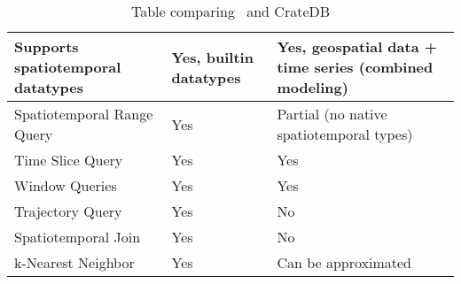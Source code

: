 \begin{table}[h]
\begin{tabular}{|P{3.3cm}|P{6cm}|P{4cm}|}
    Supports spatiotemporal datatypes & Yes, builtin datatypes                                              & Yes, geospatial data + time series (combined modeling) \\
    \hline
    Spatiotemporal Range Query        & Yes                                                                 & Partial (no native spatiotemporal types)               \\
    \hline
    Time Slice Query                  & Yes                                                                 & Yes                                                    \\
    \hline
    Window Queries                    & Yes                                                                 & Yes                                                    \\
    \hline
    Trajectory Query                  & Yes                                                                 & No                                                     \\
    \hline
    Spatiotemporal Join               & Yes                                                                 & No                                                \\
    \hline
    k-Nearest Neighbor                & Yes                                                                 & Can be approximated   \\
    \hline
  \end{tabular}
  \caption{Table comparing \mobilitydbc~and CrateDB}
  \label{tab:mobilitydb_vs_cratedb}
\end{table}




